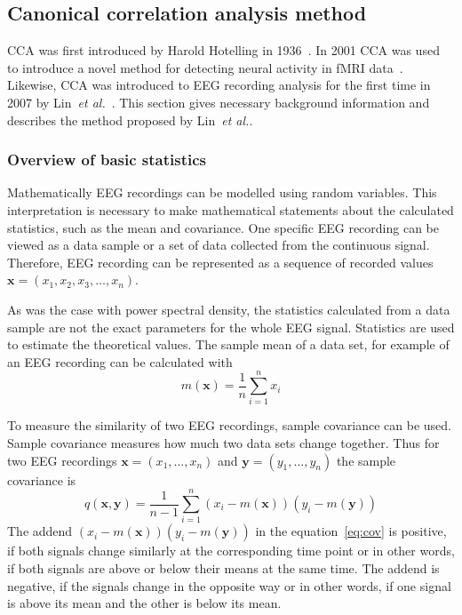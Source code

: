 \subsection{Canonical correlation analysis method}

\Gls{CCA} was first introduced by Harold Hotelling in 1936~\cite{cca_hotelling}. In 2001 \gls{CCA} was used to introduce a novel method for detecting neural activity in \gls{fMRI} data~\cite{cca_fmri}. Likewise, \gls{CCA} was introduced to \gls{EEG} recording analysis for the first time in 2007 by Lin~\textit{et al.}~\cite{cca_lin}. This section gives necessary background information and describes the method proposed by Lin~\textit{et al.}.

\subsubsection{Overview of basic statistics}

Mathematically \gls{EEG} recordings can be modelled using random variables. This interpretation is necessary to make mathematical statements about the calculated statistics, such as the mean and covariance. One specific \gls{EEG} recording can be viewed as a data sample or a set of data collected from the continuous signal. Therefore, \gls{EEG} recording can be represented as a sequence of recorded values $\mathbf{x}=(x_1, x_2, x_3, \dots, x_n)$. 

As was the case with \gls{power spectral density}, the statistics calculated from a data sample are not the exact parameters for the whole \gls{EEG} signal. Statistics are used to estimate the theoretical values. The sample mean of a data set, for example of an \gls{EEG} recording can be calculated with
\begin{equation}
	m(\mathbf{x}) = \frac{1}{n}\sum_{i=1}^{n}x_i
\end{equation}

To measure the similarity of two \gls{EEG} recordings, sample covariance can be used. Sample covariance measures how much two data sets change together. Thus for two \gls{EEG} recordings $\mathbf{x}=(x_1,\dots,x_n)$ and $\mathbf{y}=(y_1, \dots, y_n)$ the sample covariance is
\begin{equation}
	\label{eq:cov}
	q(\mathbf{x},\mathbf{y}) = \frac{1}{n-1}\sum_{i=1}^{n}(x_i-m(\mathbf{x}))(y_i-m(\mathbf{y}))
\end{equation}
The addend $(x_i-m(\mathbf{x}))(y_i-m(\mathbf{y}))$ in the equation~\ref{eq:cov} is positive, if both signals change similarly at the corresponding time point or in other words, if both signals are above or below their means at the same time. The addend is negative, if the signals change in the opposite way or in other words, if one signal is above its mean and the other is below its mean.

